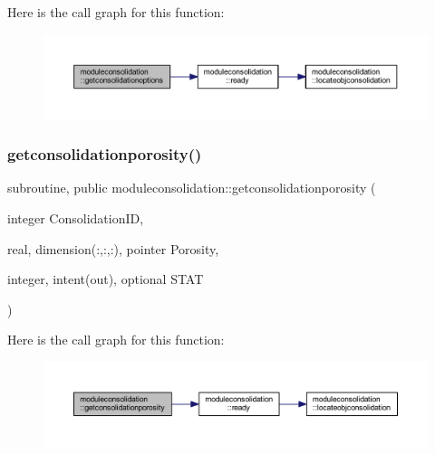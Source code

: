 Here is the call graph for this function\+:\nopagebreak
\begin{figure}[H]
\begin{center}
\leavevmode
\includegraphics[width=350pt]{namespacemoduleconsolidation_a37aecd6313d74a8d082f6b77cd63bfef_cgraph}
\end{center}
\end{figure}
\mbox{\label{namespacemoduleconsolidation_a47de60bcd271300a187a9ce6257be08e}} 
\subsubsection{\texorpdfstring{getconsolidationporosity()}{getconsolidationporosity()}}
{\footnotesize\ttfamily subroutine, public moduleconsolidation\+::getconsolidationporosity (\begin{DoxyParamCaption}\item[{integer}]{Consolidation\+ID,  }\item[{real, dimension(\+:,\+:,\+:), pointer}]{Porosity,  }\item[{integer, intent(out), optional}]{S\+T\+AT }\end{DoxyParamCaption})}

Here is the call graph for this function\+:\nopagebreak
\begin{figure}[H]
\begin{center}
\leavevmode
\includegraphics[width=350pt]{namespacemoduleconsolidation_a47de60bcd271300a187a9ce6257be08e_cgraph}
\end{center}
\end{figure}
\mbox{\label{namespacemoduleconsolidation_a529ccec5bab61ec53a0993230d6bb49c}} 
